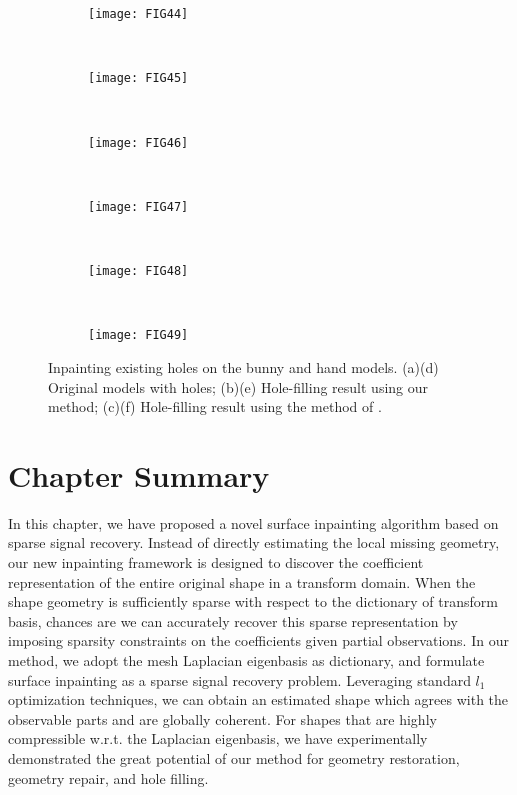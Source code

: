 \begin{figure}
\centering
    \begin{subfigure}[b]{0.33\linewidth}
        \texttt{[image: FIG44]}
        \caption{}
    \end{subfigure}%
    ~
    \begin{subfigure}[b]{0.33\linewidth}
        \texttt{[image: FIG45]}
        \caption{}
    \end{subfigure}%
    ~
    \begin{subfigure}[b]{0.33\linewidth}
        \texttt{[image: FIG46]}
        \caption{}
    \end{subfigure}
    \\
    \begin{subfigure}[b]{0.33\linewidth}
        \texttt{[image: FIG47]}
        \caption{}
    \end{subfigure}%
    ~
    \begin{subfigure}[b]{0.33\linewidth}
        \texttt{[image: FIG48]}
        \caption{}
    \end{subfigure}%
    ~
    \begin{subfigure}[b]{0.33\linewidth}
        \texttt{[image: FIG49]}
        \caption{}
    \end{subfigure}
\caption[Hole inpainting on the bunny and hand models.]
        {Inpainting existing holes on the bunny and hand models. (a)(d) Original models with holes;
        (b)(e) Hole-filling result using our method;
        (c)(f) Hole-filling result using the method of \cite{Bac2008}.}
\label{fig:holefilling2}
\end{figure}

\section{Chapter Summary}
In this chapter, we have proposed a novel surface inpainting algorithm based on
sparse signal recovery. Instead of directly estimating the local missing
geometry, our new inpainting framework is designed to discover the coefficient
representation of the entire original shape in a transform domain. When the
shape geometry is sufficiently sparse with respect to the dictionary of
transform basis, chances are we can accurately recover this sparse
representation by imposing sparsity constraints on the coefficients given
partial observations. In our method, we adopt the mesh Laplacian eigenbasis as
dictionary, and formulate surface inpainting as a sparse signal recovery
problem. Leveraging standard $l_1$ optimization techniques, we can obtain an
estimated shape which agrees with the observable parts and are globally
coherent. For shapes that are highly compressible w.r.t. the Laplacian
eigenbasis, we have experimentally demonstrated the great potential of our
method for geometry restoration, geometry repair, and hole filling.

